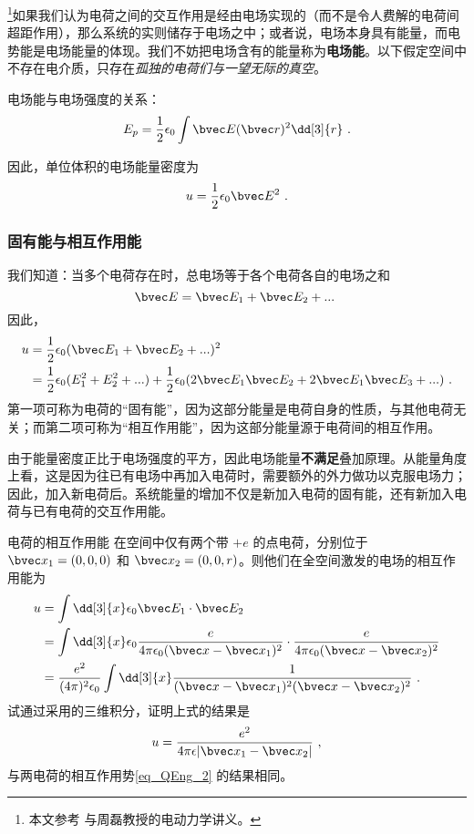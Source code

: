 

\footnote{本文参考 \cite{GriffE} 与周磊教授的电动力学讲义。}如果我们认为电荷之间的交互作用是经由电场实现的（而不是令人费解的电荷间超距作用），那么系统的实则储存于电场之中；或者说，电场本身具有能量，而电势能是电场能量的体现。我们不妨把电场含有的能量称为\textbf{电场能}。以下假定空间中不存在电介质，只存在\textsl{孤独的电荷们与一望无际的真空}。

电场能与电场强度的关系：
\begin{equation}\label{eq_EEng_2}
E_p = \frac12 \epsilon_0 \int \bvec E(\bvec r)^2 \dd[3]{r}~.
\end{equation}

因此，单位体积的电场能量密度为
\begin{equation}
u = \frac12 \epsilon_0 \bvec E^2~.
\end{equation}

\subsubsection{固有能与相互作用能}
我们知道：当多个电荷存在时，总电场等于各个电荷各自的电场之和
$$
\bvec E = \bvec E_1 + \bvec E_2 +... ~
$$
因此，
$$
\begin{aligned}
u &= \frac12 \epsilon_0 (\bvec E_1 + \bvec E_2 +... )^2\\
&=\frac12 \epsilon_0(E_1^2+E_2^2+...)+\frac12 \epsilon_0 (2\bvec E_1 \bvec E_2+2\bvec E_1 \bvec E_3+...)~.
\end{aligned}
$$
第一项可称为电荷的“固有能”，因为这部分能量是电荷自身的性质，与其他电荷无关；而第二项可称为“相互作用能”，因为这部分能量源于电荷间的相互作用。

由于能量密度正比于电场强度的平方，因此电场能量\textbf{不满足}叠加原理。从能量角度上看，这是因为往已有电场中再加入电荷时，需要额外的外力做功以克服电场力；因此，加入新电荷后。系统能量的增加不仅是新加入电荷的固有能，还有新加入电荷与已有电荷的交互作用能。
\begin{exercise}{电荷的相互作用能}
在空间中仅有两个带 $+e$ 的点电荷，分别位于 $\bvec x_1=(0,0,0)$ 和 $\bvec x_2=(0,0,r)$。则他们在全空间激发的电场的相互作用能为
\begin{equation}
\begin{aligned}
u&=\int \dd[3]{x} \epsilon_0 \bvec E_1\cdot \bvec E_2\\
&=\int \dd[3]{x} \epsilon_0 \frac{e}{4\pi\epsilon_0(\bvec x-\bvec x_1)^2}\cdot \frac{e}{4\pi\epsilon_0(\bvec x-\bvec x_2)^2}\\
&=\frac{e^2}{(4\pi)^2\epsilon_0} \int\dd[3]{x} \frac{1}{(\bvec x-\bvec x_1)^2(\bvec x-\bvec x_2)^2}~.
\end{aligned}
\end{equation}
试通过采用的三维积分，证明上式的结果是
\begin{equation}
u=\frac{e^2}{4\pi \epsilon|\bvec x_1-\bvec x_2|}~,
\end{equation}
与两电荷的相互作用势\autoref{eq_QEng_2} 的结果相同。
\end{exercise}

